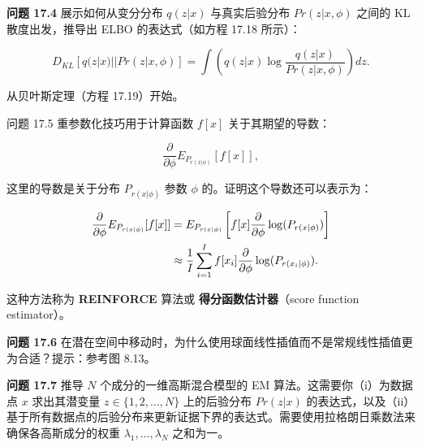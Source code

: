\textbf{问题 17.4} 展示如何从变分分布 \(q(z|x)\) 与真实后验分布 \(Pr(z|x, \phi)\) 之间的 KL 散度出发，推导出 ELBO 的表达式（如方程 17.18 所示）：

\begin{equation}
D_{KL} [q(z|x) || Pr(z|x, \phi)] = \int (q(z|x) \log \frac{q(z|x)}{Pr(z|x, \phi)}) dz. 
\end{equation}

从贝叶斯定理（方程 17.19）开始。

问题 17.5 重参数化技巧用于计算函数 \(f[x]\) 关于其期望的导数：

\begin{equation}
\frac{\partial}{\partial\phi} E_{P_{r(x|\phi)}} [f[x]], 
\end{equation}

这里的导数是关于分布 \(P_{r(x|\phi)}\) 参数 \(\phi\) 的。证明这个导数还可以表示为：


\begin{align}
\frac{\partial}{\partial\phi} E_{P_{r(x|\phi)}} [f[x]] &= E_{P_{r(x|\phi)}} \left[ f[x] \frac{\partial}{\partial\phi} \log(P_{r(x|\phi)}) \right] \notag \\
&\approx \frac{1}{I} \sum_{i=1}^{I} f[x_i] \frac{\partial}{\partial\phi} \log(P_{r(x_i|\phi)}). 
\end{align} 


这种方法称为 \textbf{REINFORCE} 算法或 \textbf{得分函数估计器}（score function estimator）。

\textbf{问题 17.6} 在潜在空间中移动时，为什么使用球面线性插值而不是常规线性插值更为合适？提示：参考图 8.13。

\textbf{问题 17.7} 推导 \(N\) 个成分的一维高斯混合模型的 EM 算法。这需要你（i）为数据点 \(x\) 求出其潜变量 \(z \in \{1, 2, \ldots, N\}\) 上的后验分布 \(Pr(z|x)\) 的表达式，以及（ii）基于所有数据点的后验分布来更新证据下界的表达式。需要使用拉格朗日乘数法来确保各高斯成分的权重 \(\lambda_1, \ldots, \lambda_N\) 之和为一。
